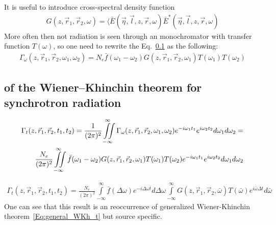     
    It is useful to introduce cross-spectral density function
    \begin{align}
        G(z, \vec{r}_1, \vec{r}_2, \omega) = \langle\bar{E}(\vec{\eta}, \vec{l}, z, \vec{r}, \omega)\bar{E}^*(\vec{\eta}, \vec{l}, z, \vec{r}, \omega)
    \end{align}
    More often then not radiation is seen through an monochromator with transfer function $T(\omega)$, so one need to rewrite the Eq.~\ref{} as the following: 
    \begin{align}
        \Gamma_\omega (z, \vec{r}_1, \vec{r}_2, \omega_1, \omega_2) = N_e \bar{f}(\omega_1 - \omega_2) G(z, \vec{r}_1, \vec{r}_2, \omega_1) T(\omega_1) T(\omega_2)
    \end{align}

    \subsection{ of the Wiener–Khinchin theorem for synchrotron radiation}
    \begin{align}
        \Gamma_t(z, \vec{r}_1, \vec{r}_2, t_1, t_2) = 
        \frac{1}{(2 \pi)^2}\iint \limits_{-\infty}^{\infty} \Gamma_\omega (z, \vec{r}_1, \vec{r}_2, \omega_1, \omega_2) e^{-i\omega_1 t_1} e^{i\omega_2 t_2} d\omega_1 d\omega_2 = \cr
        \frac{N_e}{(2 \pi)^2}\iint \limits_{-\infty}^{\infty} \bar{f}(\omega_1 - \omega_2) G(z, \vec{r}_1, \vec{r}_2, \omega_1) T(\omega_1) T(\omega_2) e^{-i\omega_1 t_1} e^{i\omega_2 t_2} d\omega_1 d\omega_2
    \end{align}

    \begin{align}
        \Gamma_t(z, \vec{r}_1, \vec{r}_2, t_1, t_2) = 
        \frac{N_e}{(2 \pi)^2}\int \limits_{-\infty}^{\infty} \bar{f}(\Delta \omega) e^{-i\Delta \omega \bar{t}}d\Delta \omega \int \limits_{-\infty}^{\infty} G(z, \vec{r}_1, \vec{r}_2,\bar{\omega}) T(\bar{\omega}) e^{i\bar{\omega} \Delta t}d\bar{\omega}
    \end{align}
    One can see that this result is an reoccurrence of generalized Wiener-Khinchin theorem~\ref{Eq:general_WKh_t} but source specific.



